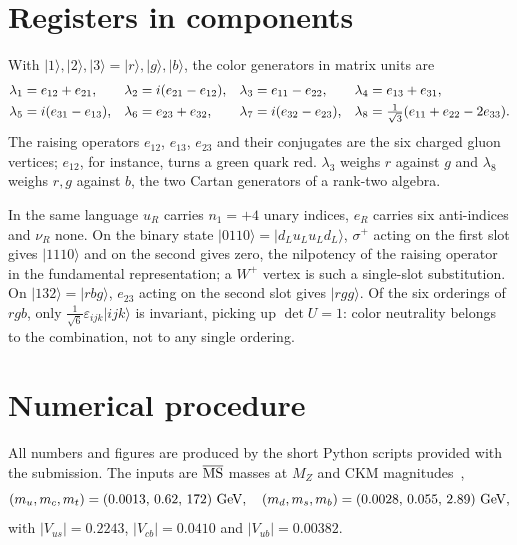 \documentclass[submission, Phys]{SciPost}
\newcommand{\ket}[1]{|#1\rangle}
\begin{document}
\begin{appendix}

\section{Registers in components}
\label{app:registers}

With $\ket1,\ket2,\ket3=\ket r,\ket g,\ket b$, the color generators in
matrix units are
\begin{align}
  \lambda_1&=e_{12}+e_{21}, &
  \lambda_2&=i(e_{21}-e_{12}), &
  \lambda_3&=e_{11}-e_{22}, &
  \lambda_4&=e_{13}+e_{31}, \notag\\
  \lambda_5&=i(e_{31}-e_{13}), &
  \lambda_6&=e_{23}+e_{32}, &
  \lambda_7&=i(e_{32}-e_{23}), &
  \lambda_8&=\tfrac{1}{\sqrt3}(e_{11}+e_{22}-2e_{33}).
\end{align}
The raising operators $e_{12}$, $e_{13}$, $e_{23}$ and their conjugates
are the six charged gluon vertices; $e_{12}$, for instance, turns a green
quark red. $\lambda_3$ weighs $r$ against $g$ and $\lambda_8$ weighs
$r,g$ against $b$, the two Cartan generators of a rank-two algebra.

In the same language $u_R$ carries $n_1=+4$ unary indices, $e_R$ carries
six anti-indices and $\nu_R$ none. On the binary state
$\ket{0110}=\ket{d_Lu_Lu_Ld_L}$, $\sigma^+$ acting on the first slot gives
$\ket{1110}$ and on the second gives zero, the nilpotency of the
raising operator in the fundamental representation; a $W^+$ vertex is
such a single-slot substitution. On $\ket{132}=\ket{rbg}$, $e_{23}$ acting
on the second slot gives $\ket{rgg}$. Of the six orderings of $rgb$,
only $\tfrac1{\sqrt6}\varepsilon_{ijk}\ket{ijk}$ is invariant, picking up
$\det U=1$: color neutrality belongs to the combination, not to any
single ordering.

\section{Numerical procedure}
\label{app:numerics}

All numbers and figures are produced by the short Python scripts
provided with the submission. The inputs are $\overline{\rm MS}$ masses at $M_Z$ and CKM magnitudes~\cite{ParticleDataGroup:2024cfk},
\begin{equation}
  (m_u,m_c,m_t)=(0.0013,\,0.62,\,172)~{\rm GeV},\quad
  (m_d,m_s,m_b)=(0.0028,\,0.055,\,2.89)~{\rm GeV},
\end{equation}
with $|V_{us}|=0.2243$, $|V_{cb}|=0.0410$ and $|V_{ub}|=0.00382$.


\end{appendix}
\end{document}
